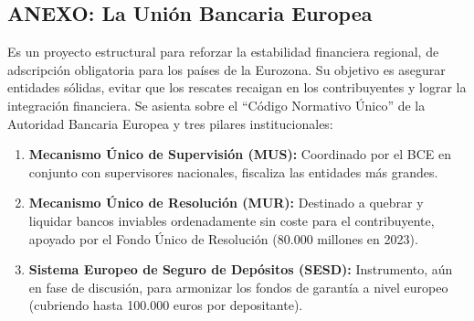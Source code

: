 \subsection*{ANEXO: La Unión Bancaria Europea}

Es un proyecto estructural para reforzar la estabilidad financiera regional, de adscripción obligatoria para los países de la Eurozona. Su objetivo es asegurar entidades sólidas, evitar que los rescates recaigan en los contribuyentes y lograr la integración financiera. Se asienta sobre el ``Código Normativo Único'' de la Autoridad Bancaria Europea y tres pilares institucionales:

\begin{enumerate}
  \item \textbf{Mecanismo Único de Supervisión (MUS):} Coordinado por el BCE en conjunto con supervisores nacionales, fiscaliza las entidades más grandes.
  \item \textbf{Mecanismo Único de Resolución (MUR):} Destinado a quebrar y liquidar bancos inviables ordenadamente sin coste para el contribuyente, apoyado por el Fondo Único de Resolución (80.000 millones en 2023).
  \item \textbf{Sistema Europeo de Seguro de Depósitos (SESD):} Instrumento, aún en fase de discusión, para armonizar los fondos de garantía a nivel europeo (cubriendo hasta 100.000 euros por depositante).
\end{enumerate}